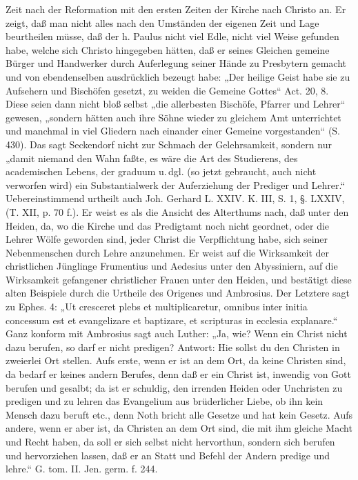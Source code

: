 Zeit nach der Reformation mit den ersten Zeiten der Kirche nach Christo an. Er zeigt, daß man nicht alles nach den Umständen der eigenen Zeit und Lage beurtheilen müsse, daß der h. Paulus nicht viel Edle, nicht viel Weise gefunden habe, welche sich Christo hingegeben hätten, daß er seines Gleichen gemeine Bürger und Handwerker durch Auferlegung seiner Hände zu Presbytern gemacht und von ebendenselben ausdrücklich bezeugt habe: „Der heilige Geist habe sie zu Aufsehern und Bischöfen gesetzt, zu weiden die Gemeine Gottes“ Act. 20, 8. Diese seien dann nicht bloß selbst „die allerbesten Bischöfe, Pfarrer und Lehrer“ gewesen, „sondern hätten auch ihre Söhne wieder zu gleichem Amt unterrichtet und manchmal in viel Gliedern nach einander einer Gemeine vorgestanden“ (S. 430). Das sagt Seckendorf nicht zur Schmach der Gelehrsamkeit, sondern nur „damit niemand den Wahn faßte, es wäre die Art des Studierens, des academischen Lebens, der graduum u.\,dgl. (so jetzt gebraucht, auch nicht verworfen wird) ein Substantialwerk der Auferziehung der Prediger und Lehrer.“ Uebereinstimmend urtheilt auch Joh. Gerhard L. XXIV. K. III, S. 1, §. LXXIV, (T. XII, p. 70 f.). Er weist es als die Ansicht des Alterthums nach, daß unter den Heiden, da, wo die Kirche und das Predigtamt noch nicht geordnet, oder die Lehrer Wölfe geworden sind, jeder Christ die Verpflichtung habe, sich seiner Nebenmenschen durch Lehre anzunehmen. Er weist auf die Wirksamkeit der christlichen Jünglinge Frumentius und Aedesius unter den Abyssiniern, auf die Wirksamkeit gefangener christlicher Frauen unter den Heiden, und bestätigt
diese alten Beispiele durch die Urtheile des Origenes und Ambrosius. Der Letztere sagt zu Ephes. 4: „Ut cresceret plebs et multiplicaretur, omnibus inter initia concessum est et evangelizare et baptizare, et scripturas in ecclesia explanare.“ Ganz konform mit Ambrosius sagt auch Luther: „Ja, wie? Wenn ein Christ nicht dazu berufen, so darf er nicht predigen? Antwort: Hie sollst du den Christen in zweierlei Ort stellen. Aufs erste, wenn er ist an dem Ort, da keine Christen sind, da bedarf er keines andern Berufes, denn daß er ein Christ ist, inwendig von Gott berufen und gesalbt; da ist er schuldig, den irrenden Heiden oder Unchristen zu predigen und zu lehren das Evangelium aus brüderlicher Liebe, ob ihn kein Mensch dazu beruft etc., denn Noth bricht alle Gesetze und hat kein Gesetz. Aufs andere, wenn er aber ist, da Christen an dem Ort sind, die mit ihm gleiche Macht und Recht haben, da soll er sich selbst nicht hervorthun, sondern sich berufen und hervorziehen lassen, daß er an Statt und Befehl der Andern predige und lehre.“ G. tom. II. Jen. germ. f. 244.

